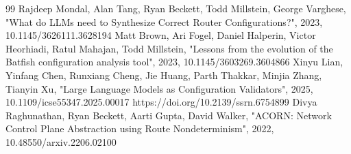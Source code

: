 \documentclass[conference]{IEEEtran}
\begin{document}
\begin{thebibliography}{99}
 Rajdeep Mondal, Alan Tang, Ryan Beckett, Todd Millstein, George Varghese, "What do LLMs need to Synthesize Correct Router Configurations?", 2023, 10.1145/3626111.3628194
 Matt Brown, Ari Fogel, Daniel Halperin, Victor Heorhiadi, Ratul Mahajan, Todd Millstein, "Lessons from the evolution of the Batfish configuration analysis tool", 2023, 10.1145/3603269.3604866
 Xinyu Lian, Yinfang Chen, Runxiang Cheng, Jie Huang, Parth Thakkar, Minjia Zhang, Tianyin Xu, "Large Language Models as Configuration Validators", 2025, 10.1109/icse55347.2025.00017
 https://doi.org/10.2139/ssrn.6754899
 Divya Raghunathan, Ryan Beckett, Aarti Gupta, David Walker, "ACORN: Network Control Plane Abstraction using Route Nondeterminism", 2022, 10.48550/arxiv.2206.02100
\end{thebibliography}
\end{document}
